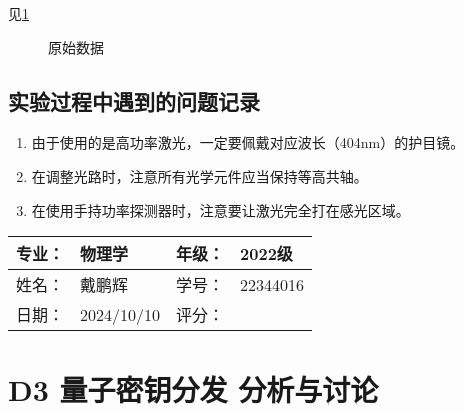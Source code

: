 \documentclass[dvipsnames, svgnames,a4paper,11pt]{article}
\begin{document}
	见\cref{fig:data}

	\begin{figure}[htbp]
		\centering
		\quad
		\quad
		\newline
		\quad
		\caption{原始数据}
		\label{fig:data}
	\end{figure}
	






\subsection{实验过程中遇到的问题记录}

\begin{enumerate}
	\item 由于使用的是高功率激光，一定要佩戴对应波长（404nm）的护目镜。
	\item 在调整光路时，注意所有光学元件应当保持等高共轴。
	\item 在使用手持功率探测器时，注意要让激光完全打在感光区域。
	
\end{enumerate}
	

\clearpage
\begin{table}
	\renewcommand\arraystretch{1.7}
	\begin{tabularx}{\textwidth}{|X|X|X|X|}
	\hline
	专业：& 物理学 &年级：& 2022级\\
	\hline
	姓名： & 戴鹏辉 & 学号：& 22344016\\
	\hline
    日期：& 2024/10/10 & 评分： &\\
	\hline
	\end{tabularx}
\end{table}

\section{D3 \quad 量子密钥分发 \quad\heiti 分析与讨论}
\end{document}
